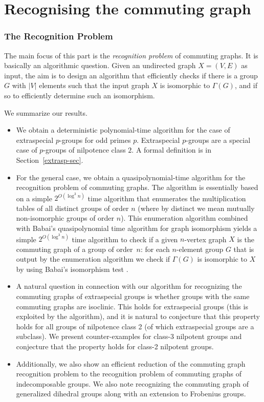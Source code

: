 \documentclass{elsarticle}
\begin{document}
\part{Recognising the commuting graph}

\section{The Recognition Problem}

The main focus of this part is the \emph{recognition problem} of
commuting graphs. It is basically an algorithmic question. Given an
undirected graph $X=(V,E)$ as input, the aim is to design an algorithm
that efficiently checks if there is a group $G$ with $|V|$ elements
such that the input graph $X$ is isomorphic to $\Gamma(G)$, and if so
to efficiently determine such an isomorphism.

We summarize our results.

\begin{itemize}
\item We obtain a deterministic polynomial-time algorithm for the case
  of extraspecial $p$-groups for odd primes $p$.  Extraspecial
  $p$-groups are a special case of $p$-groups of nilpotence class $2$.
  A formal definition is in Section~\ref{extrasp-sec}.
\item For the general case, we obtain a quasipolynomial-time algorithm
  for the recognition problem of commuting graphs. The algorithm is
  essentially based on a simple $2^{O(\log^3n)}$ time algorithm that
  enumerates the multiplication tables of all distinct groups of order
  $n$ (where by distinct we mean mutually non-isomorphic groups of
  order $n$). This enumeration algorithm combined with Babai's
  quasipolynomial time algorithm for graph isomorphism \cite{B16}
  yields a simple $2^{O(\log^3n)}$ time algorithm to check if a given
  $n$-vertex graph $X$ is the commuting graph of a group of order~$n$:
  for each $n$-element group $G$ that is output by the enumeration
  algorithm we check if $\Gamma(G)$ is isomorphic to $X$ by using
  Babai's isomorphism test \cite{B16}.
\item A natural question in connection with our algorithm for recognizing
the commuting graphs of extraspecial groups is whether groups with the
same commuting graphs are isoclinic. This holds for extraspecial
groups (this is exploited by the algorithm), and it is natural to
conjecture that this property holds for all groups of nilpotence class
2 (of which extraspecial groups are a subclass). We present
counter-examples for class-3 nilpotent groups and conjecture that the
property holds for class-2 nilpotent groups.
\item Additionally, we also show an efficient reduction of the
  commuting graph recognition problem to the recognition problem of
  commuting graphs of indecomposable groups. We also note recognizing
  the commuting graph of generalized dihedral groups along with an extension
  to Frobenius groups.
\end{itemize}
\end{document}
